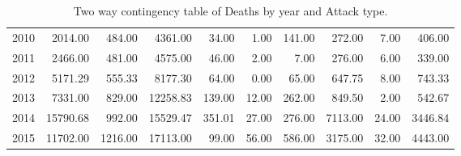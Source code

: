 \begin{sidewaystable}
{\begin{tabular}{rrrrrrrrrr}
  2010 & 2014.00 & 484.00 & 4361.00 & 34.00 & 1.00 & 141.00 & 272.00 & 7.00 & 406.00 \\ 
  2011 & 2466.00 & 481.00 & 4575.00 & 46.00 & 2.00 & 7.00 & 276.00 & 6.00 & 339.00 \\ 
  2012 & 5171.29 & 555.33 & 8177.30 & 64.00 & 0.00 & 65.00 & 647.75 & 8.00 & 743.33 \\ 
  2013 & 7331.00 & 829.00 & 12258.83 & 139.00 & 12.00 & 262.00 & 849.50 & 2.00 & 542.67 \\ 
  2014 & 15790.68 & 992.00 & 15529.47 & 351.01 & 27.00 & 276.00 & 7113.00 & 24.00 & 3446.84 \\ 
  2015 & 11702.00 & 1216.00 & 17113.00 & 99.00 & 56.00 & 586.00 & 3175.00 & 32.00 & 4443.00 \\ 
   \hline
\end{tabular}}
\caption{Two way contingency table of Deaths by year and Attack type.}
\label{tab:attacksyear}
\end{sidewaystable}





